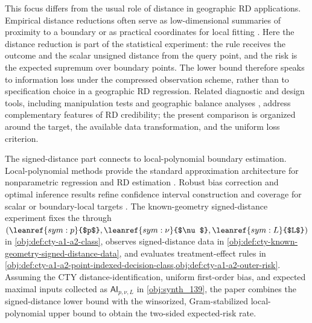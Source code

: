 This focus differs from the usual role of distance in geographic RD applications. Empirical distance reductions often serve as low-dimensional summaries of proximity to a boundary or as practical coordinates for local fitting \citep{Keele2015a,Keele2015b,Keele2016,Kendall2026}. Here the distance reduction is part of the statistical experiment: the rule receives the outcome and the scalar unsigned distance from the query point, and the risk is the expected supremum over boundary points. The lower bound therefore speaks to information loss under the compressed observation scheme, rather than to specification choice in a geographic RD regression. Related diagnostic and design tools, including manipulation tests and geographic balance analyses \citep{McCrary2008,Cattaneo2022,Cattaneo2020,Cattaneo2023,Cattaneo2025}, address complementary features of RD credibility; the present comparison is organized around the target, the available data transformation, and the uniform loss criterion.

The signed-distance part connects to local-polynomial boundary estimation. Local-polynomial methods provide the standard approximation architecture for nonparametric regression and RD estimation \citep{Fan1996,Ruppert1994,Calonico2014,Calonico2020,Imbens2019}. Robust bias correction and optimal inference results refine confidence interval construction and coverage for scalar or boundary-local targets \citep{Calonico2014,Calonico2020,Armstrong2020,Kolesar2018}. The known-geometry signed-distance experiment fixes the  through \((\leanref{sym:p}{$p$},\leanref{sym:\nu}{$\nu$},\leanref{sym:L}{$L$})\) in \cref{obj:def:cty-a1-a2-class}, observes signed-distance data in \cref{obj:def:cty-known-geometry-signed-distance-data}, and evaluates treatment-effect rules in \cref{obj:def:cty-a1-a2-point-indexed-decision-class,obj:def:cty-a1-a2-outer-risk}. Assuming the CTY distance-identification, uniform first-order bias, and expected maximal inputs collected as \(\mathsf{AI}_{p,\nu,L}\) in \cref{obj:synth_139}, the paper combines the signed-distance lower bound with the winsorized, Gram-stabilized local-polynomial upper bound to obtain the two-sided expected-risk rate.

